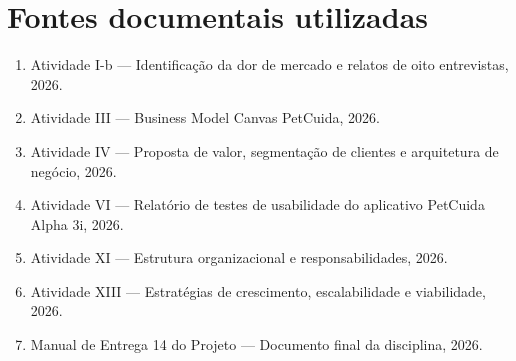 \documentclass[12pt,a4paper]{article}
\begin{document}
\section{Fontes documentais utilizadas}
\begin{enumerate}[leftmargin=*]
  \item Atividade I-b — Identificação da dor de mercado e relatos de oito entrevistas, 2026.
  \item Atividade III — Business Model Canvas PetCuida, 2026.
  \item Atividade IV — Proposta de valor, segmentação de clientes e arquitetura de negócio, 2026.
  \item Atividade VI — Relatório de testes de usabilidade do aplicativo PetCuida Alpha 3i, 2026.
  \item Atividade XI — Estrutura organizacional e responsabilidades, 2026.
  \item Atividade XIII — Estratégias de crescimento, escalabilidade e viabilidade, 2026.
  \item Manual de Entrega 14 do Projeto — Documento final da disciplina, 2026.
\end{enumerate}
\end{document}

